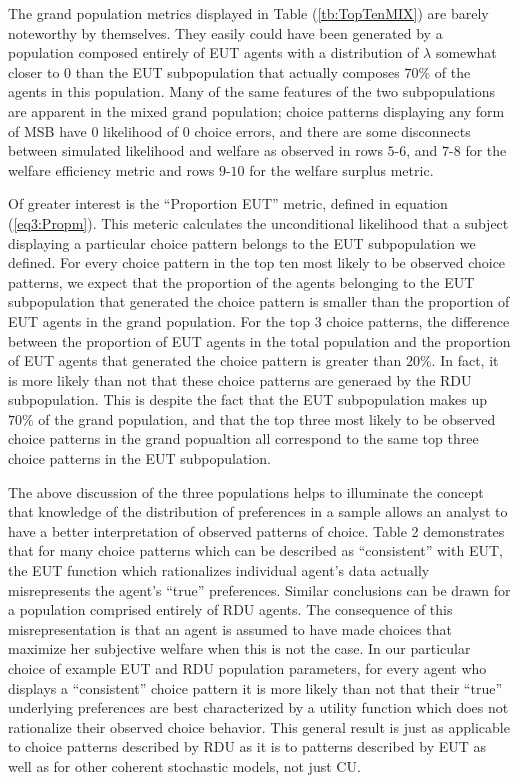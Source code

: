 \documentclass[../main.tex]{subfiles}
\begin{document}
The grand population metrics displayed in Table (\ref{tb:TopTenMIX}) are barely noteworthy by themselves.
They easily could have been generated by a population composed entirely of EUT agents with a distribution of $\lambda$ somewhat closer to $0$ than the EUT subpopulation that actually composes $70\%$ of the agents in this population.
Many of the same features of the two subpopulations are apparent in the mixed grand population;
choice patterns displaying any form of MSB have $0$ likelihood of $0$ choice errors, and there are some disconnects between simulated likelihood and welfare as observed in rows $5$-$6$, and $7$-$8$ for the welfare efficiency metric and rows $9$-$10$ for the welfare surplus metric.

Of greater interest is the \enquote{Proportion EUT} metric, defined in equation (\ref{eq3:Propm}).
This meteric calculates the unconditional likelihood that a subject displaying a particular choice pattern belongs to the EUT subpopulation we defined.
For every choice pattern in the top ten most likely to be observed choice patterns, we expect that the proportion of the agents belonging to the EUT subpopulation that generated the choice pattern is smaller than the proportion of EUT agents in the grand population.
For the top 3 choice patterns, the difference between the proportion of EUT agents in the total population and the proportion of EUT agents that generated the choice pattern is greater than $20\%$.
In fact, it is more likely than not that these choice patterns are generaed by the RDU subpopulation.
This is despite the fact that the EUT subpopulation makes up $70\%$ of the grand population, and that the top three most likely to be observed choice patterns in the grand popualtion all correspond to the same top three choice patterns in the EUT subpopulation.

The above discussion of the three populations helps to illuminate the concept that knowledge of the distribution of preferences in a sample allows an analyst to have a better interpretation of observed patterns of choice.
Table 2 demonstrates that for many choice patterns which can be described as \enquote{consistent} with EUT, the EUT function which rationalizes individual agent's data actually misrepresents the agent's \enquote{true} preferences.
Similar conclusions can be drawn for a population comprised entirely of RDU agents.
The consequence of this misrepresentation is that an agent is assumed to have made choices that maximize her subjective welfare when this is not the case.
In our particular choice of example EUT and RDU population parameters, for every agent who displays a \enquote{consistent} choice pattern it is more likely than not that their \enquote{true} underlying preferences are best characterized by a utility function which does not rationalize their observed choice behavior.
This general result is just as applicable to choice patterns described by RDU as it is to patterns described by EUT as well as for other coherent stochastic models, not just CU.
\end{document}
